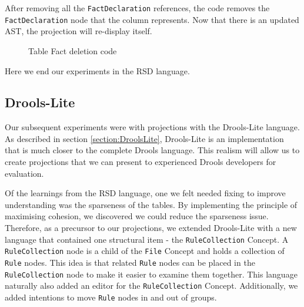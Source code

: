 After removing all the \texttt{FactDeclaration} references, the code removes the \texttt{FactDeclaration}  node that the column represents.
Now that there is an updated AST, the projection will re-display itself. 

\begin{figure}
    \centering
    \caption{Table Fact deletion code}
    \label{fig:tableFactDeletion}
\end{figure}

Here we end our experiments in the RSD language.

\newpage

\subsection{Drools-Lite}

Our subsequent experiments were with projections with the Drools-Lite language.
As described in section \ref{section:DroolsLite}, Drools-Lite is an implementation that is much closer to the complete Drools language.
This realism will allow us to create projections that we can present to experienced Drools developers for evaluation.

Of the learnings from the RSD language, one we felt needed fixing to improve understanding was the sparseness of the tables.
By implementing the principle of maximising cohesion, we discovered we could reduce the sparseness issue.
Therefore, as a precursor to our projections, we extended Drools-Lite with a new language that contained one structural item - the \texttt{RuleCollection} Concept.
A \texttt{RuleCollection} node is a child of the \texttt{File} Concept and holds a collection of \texttt{Rule} nodes.
This idea is that related \texttt{Rule} nodes can be placed in the \texttt{RuleCollection}  node to make it easier to examine them together.
This language naturally also added an editor for the \texttt{RuleCollection} Concept.
Additionally, we added intentions to move \texttt{Rule} nodes in and out of groups.

